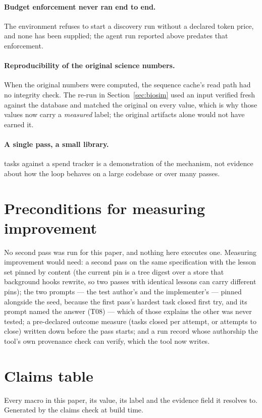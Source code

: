 \documentclass[10pt]{article}
\begin{document}
\paragraph{Budget enforcement never ran end to end.} The environment refuses to start a discovery run without a declared token price, and none has been supplied; the agent run reported above predates that enforcement.

\paragraph{Reproducibility of the original science numbers.} When the original numbers were computed, the sequence cache's read path had no integrity check. The re-run in Section~\ref{sec:biosim} used an input verified fresh against the database and matched the original on every value, which is why those values now carry a \emph{measured} label; the original artifacts alone would not have earned it.

\paragraph{A single pass, a small library.} \claimunits{} tasks against a spend tracker is a demonstration of the mechanism, not evidence about how the loop behaves on a large codebase or over many passes.

\section{Preconditions for measuring improvement}\label{sec:next}

No second pass was run for this paper, and nothing here executes one. Measuring improvement would need: a second pass on the same specification with the lesson set pinned by content (the current pin is a tree digest over a store that background hooks rewrite, so two passes with identical lessons can carry different pins); the two prompts --- the test author's and the implementer's --- pinned alongside the seed, because the first pass's hardest task closed first try, and its prompt named the answer (T08) --- which of those explains the other was never tested; a pre-declared outcome measure (tasks closed per attempt, or attempts to close) written down before the pass starts; and a run record whose authorship the tool's own provenance check can verify, which the tool now writes.

\appendix
\section{Claims table}
Every macro in this paper, its value, its label and the evidence field it resolves to. Generated by the claims check at build time.
\end{document}

